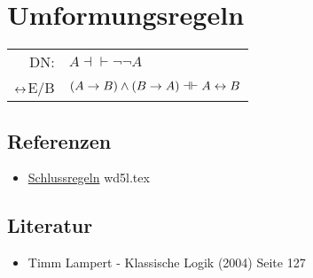 \documentclass{sajzk}
\begin{document}
\section{Umformungsregeln}
\label{0ku1}

\begin{center}
    \begin{tabular}{rl}
        DN:       & $A\dashv\vdash \lnot\lnot A$ \\
        $\leftrightarrow$E/B & $(A\rightarrow B) \land (B \rightarrow A) \dashv\vdash A \leftrightarrow B$ \\
    \end{tabular}
\end{center}

\subsection{Referenzen}
\begin{itemize}
    \item \href{wd5l.pdf}{Schlussregeln} wd5l.tex
\end{itemize}

\subsection{Literatur}
\begin{itemize}
    \item Timm Lampert - Klassische Logik (2004) Seite 127
\end{itemize}
\end{document}
